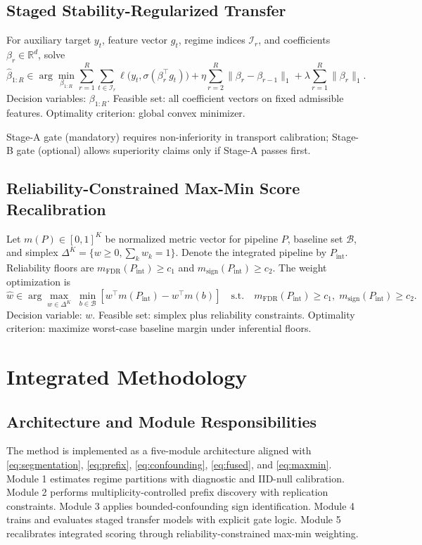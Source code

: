 \documentclass{article} %
\begin{document}
\subsection{Staged Stability-Regularized Transfer}
For auxiliary target $y_t$, feature vector $g_t$, regime indices $\mathcal{I}_r$, and coefficients $\beta_r\in\mathbb{R}^d$, solve
\begin{equation}
\hat{\beta}_{1:R}\in\arg\min_{\beta_{1:R}}
\sum_{r=1}^{R}\sum_{t\in\mathcal{I}_r}\ell\big(y_t,\sigma(\beta_r^\top g_t)\big)
+\eta\sum_{r=2}^{R}\|\beta_r-\beta_{r-1}\|_1
+\lambda\sum_{r=1}^{R}\|\beta_r\|_1.
\label{eq:fused}
\end{equation}
Decision variables: $\beta_{1:R}$. Feasible set: all coefficient vectors on fixed admissible features. Optimality criterion: global convex minimizer.

Stage-A gate (mandatory) requires non-inferiority in transport calibration; Stage-B gate (optional) allows superiority claims only if Stage-A passes first.

\subsection{Reliability-Constrained Max-Min Score Recalibration}
Let $m(P)\in[0,1]^K$ be normalized metric vector for pipeline $P$, baseline set $\mathcal{B}$, and simplex $\Delta^K=\{w\ge0,\sum_k w_k=1\}$. Denote the integrated pipeline by $P_{\mathrm{int}}$. Reliability floors are $m_{\mathrm{FDR}}(P_{\mathrm{int}})\ge c_1$ and $m_{\mathrm{sign}}(P_{\mathrm{int}})\ge c_2$. The weight optimization is
\begin{equation}
\hat{w}\in\arg\max_{w\in\Delta^K}\;\min_{b\in\mathcal{B}}\left[w^\top m(P_{\mathrm{int}})-w^\top m(b)\right]
\quad\text{s.t.}\quad m_{\mathrm{FDR}}(P_{\mathrm{int}})\ge c_1,\;m_{\mathrm{sign}}(P_{\mathrm{int}})\ge c_2.
\label{eq:maxmin}
\end{equation}
Decision variable: $w$. Feasible set: simplex plus reliability constraints. Optimality criterion: maximize worst-case baseline margin under inferential floors.

\section{Integrated Methodology}\label{sec:method}
\subsection{Architecture and Module Responsibilities}
The method is implemented as a five-module architecture aligned with \eqref{eq:segmentation}, \eqref{eq:prefix}, \eqref{eq:confounding}, \eqref{eq:fused}, and \eqref{eq:maxmin}. Module 1 estimates regime partitions with diagnostic and IID-null calibration. Module 2 performs multiplicity-controlled prefix discovery with replication constraints. Module 3 applies bounded-confounding sign identification. Module 4 trains and evaluates staged transfer models with explicit gate logic. Module 5 recalibrates integrated scoring through reliability-constrained max-min weighting.
\end{document}
